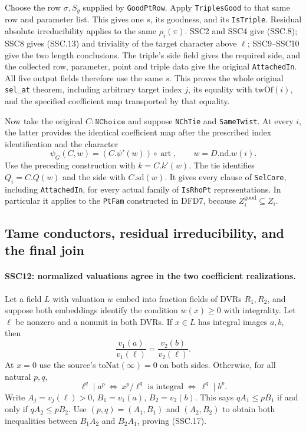 Choose the row $\sigma,S_g$ supplied by \texttt{GoodPtRow}.
Apply \texttt{TriplesGood} to that same row and parameter list.
This gives one $s$, its goodness, and its \texttt{IsTriple}.
Residual absolute irreducibility applies to the same
$\rho_i(\pi)$. SSC2 and SSC4 give (SSC.8); SSC8 gives
(SSC.13) and triviality of the target character above $\ell$;
SSC9--SSC10 give the two length conclusions. The triple's side
field gives the required side, and the collected row, parameter,
point and triple data give the original \texttt{AttachedIn}.
All five output fields therefore use the same $s$. This proves
the whole original \texttt{sel\_at} theorem, including arbitrary
target index $j$, its equality with $\mathrm{twOf}(i)$, and the
specified coefficient map transported by that equality.

Now take the original $C:\texttt{NChoice}$ and suppose
\texttt{NChTie} and \texttt{SameTwist}. At every $i$, the latter
provides the identical coefficient map after the prescribed
index identification and the character
\[
 \psi_G(C,w)=(C.\psi'(w))\circ\operatorname{art},
       \qquad w=D.\mathrm{nd}.w(i).                           \tag{SSC.16}
\]
Use the preceding construction with $k=C.k'(w)$. The tie identifies
$Q_i=C.Q(w)$ and the side with $C.\mathrm{sd}(w)$.
It gives every clause of \texttt{SelCore}, including
\texttt{AttachedIn}, for every actual family of \texttt{IsRhoPt}
representations. In particular it applies to the \texttt{PtFam}
constructed in DFD7, because $Z_i^{\mathrm{good}}\subseteq Z_i$.

\subsection{Tame conductors, residual irreducibility, and the final join}

\paragraph{SSC12: normalized valuations agree in the two coefficient realizations.}
\label{claim:SSC12}
Let a field $L$ with valuation $w$ embed into fraction fields of
DVRs $R_1,R_2$, and suppose both embeddings identify the condition
$w(x)\ge0$ with integrality. Let $\ell$ be nonzero and a nonunit
in both DVRs. If $x\in L$ has integral images $a,b$, then
\[
             \frac{v_1(a)}{v_1(\ell)}
                  =\frac{v_2(b)}{v_2(\ell)}.                 \tag{SSC.17}
\]
At $x=0$ use the source's $\mathrm{toNat}(\infty)=0$ on both
sides. Otherwise, for all natural $p,q$,
\[
 \ell^q\mid a^p
   \ \Longleftrightarrow\ x^p/\ell^q\text{ is integral}
   \ \Longleftrightarrow\ \ell^q\mid b^p.
\]
Write $A_j=v_j(\ell)>0$, $B_1=v_1(a)$, $B_2=v_2(b)$.
This says $qA_1\le pB_1$ if and only if $qA_2\le pB_2$.
Use $(p,q)=(A_1,B_1)$ and $(A_2,B_2)$ to obtain both
inequalities between $B_1A_2$ and $B_2A_1$, proving (SSC.17).

